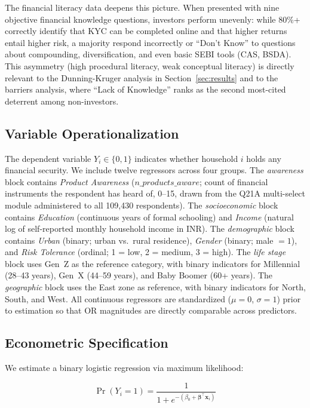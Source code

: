 \documentclass[conference]{IEEEtran}
\begin{document}
The financial literacy data deepens this picture. When presented with nine objective financial knowledge questions, investors perform unevenly: while 80\%+ correctly identify that KYC can be completed online and that higher returns entail higher risk, a majority respond incorrectly or ``Don't Know'' to questions about compounding, diversification, and even basic SEBI tools (CAS, BSDA). This asymmetry (high procedural literacy, weak conceptual literacy) is directly relevant to the Dunning-Kruger analysis in Section~\ref{sec:results} and to the barriers analysis, where ``Lack of Knowledge'' ranks as the second most-cited deterrent among non-investors.

\subsection{Variable Operationalization}
The dependent variable $Y_i \in \{0, 1\}$ indicates whether household $i$ holds any financial security. We include twelve regressors across four groups. The \textit{awareness} block contains \textit{Product Awareness} ($n\_products\_aware$; count of financial instruments the respondent has heard of, 0--15, drawn from the Q21A multi-select module administered to all 109,430 respondents). The \textit{socioeconomic} block contains \textit{Education} (continuous years of formal schooling) and \textit{Income} (natural log of self-reported monthly household income in INR). The \textit{demographic} block contains \textit{Urban} (binary; urban vs.\ rural residence), \textit{Gender} (binary; male $= 1$), and \textit{Risk Tolerance} (ordinal; 1 = low, 2 = medium, 3 = high). The \textit{life stage} block uses Gen~Z as the reference category, with binary indicators for Millennial (28--43 years), Gen~X (44--59 years), and Baby Boomer (60+ years). The \textit{geographic} block uses the East zone as reference, with binary indicators for North, South, and West. All continuous regressors are standardized ($\mu = 0$, $\sigma = 1$) prior to estimation so that OR magnitudes are directly comparable across predictors.

\subsection{Econometric Specification}
We estimate a binary logistic regression via maximum likelihood:

\begin{equation}
\Pr(Y_i = 1) = \frac{1}{1 + e^{-(\beta_0 + \boldsymbol{\beta}^\top \mathbf{x}_i)}}
\label{eq:logit}
\end{equation}
\end{document}
